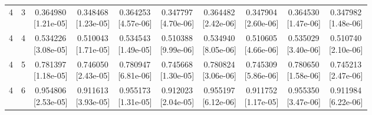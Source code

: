 \documentclass[12pt,letterpaper]{article}
\theoremstyle{plain}
\theoremstyle{definition}
\begin{document}
\begin{table}[p]
\begin{adjustbox}{max width=\linewidth}
\begin{tabular}{@{}rr*{8}{c}@{}}
4 & 3 & \shortstack{0.364980\\[-1pt]{\scriptsize[1.21e-05]}} & \shortstack{0.348468\\[-1pt]{\scriptsize[1.23e-05]}} & \shortstack{0.364253\\[-1pt]{\scriptsize[4.57e-06]}} & \shortstack{0.347797\\[-1pt]{\scriptsize[4.70e-06]}} & \shortstack{0.364482\\[-1pt]{\scriptsize[2.42e-06]}} & \shortstack{0.347904\\[-1pt]{\scriptsize[2.60e-06]}} & \shortstack{0.364530\\[-1pt]{\scriptsize[1.47e-06]}} & \shortstack{0.347982\\[-1pt]{\scriptsize[1.48e-06]}}\\
4 & 4 & \shortstack{0.534226\\[-1pt]{\scriptsize[3.08e-05]}} & \shortstack{0.510043\\[-1pt]{\scriptsize[1.71e-05]}} & \shortstack{0.534543\\[-1pt]{\scriptsize[1.49e-05]}} & \shortstack{0.510388\\[-1pt]{\scriptsize[9.99e-06]}} & \shortstack{0.534940\\[-1pt]{\scriptsize[8.05e-06]}} & \shortstack{0.510605\\[-1pt]{\scriptsize[4.66e-06]}} & \shortstack{0.535029\\[-1pt]{\scriptsize[3.40e-06]}} & \shortstack{0.510740\\[-1pt]{\scriptsize[2.10e-06]}}\\
4 & 5 & \shortstack{0.781397\\[-1pt]{\scriptsize[1.18e-05]}} & \shortstack{0.746050\\[-1pt]{\scriptsize[2.43e-05]}} & \shortstack{0.780947\\[-1pt]{\scriptsize[6.81e-06]}} & \shortstack{0.745668\\[-1pt]{\scriptsize[1.30e-05]}} & \shortstack{0.780824\\[-1pt]{\scriptsize[3.06e-06]}} & \shortstack{0.745309\\[-1pt]{\scriptsize[5.86e-06]}} & \shortstack{0.780650\\[-1pt]{\scriptsize[1.58e-06]}} & \shortstack{0.745213\\[-1pt]{\scriptsize[2.47e-06]}}\\
4 & 6 & \shortstack{0.954806\\[-1pt]{\scriptsize[2.53e-05]}} & \shortstack{0.911613\\[-1pt]{\scriptsize[3.93e-05]}} & \shortstack{0.955173\\[-1pt]{\scriptsize[1.31e-05]}} & \shortstack{0.912023\\[-1pt]{\scriptsize[2.04e-05]}} & \shortstack{0.955197\\[-1pt]{\scriptsize[6.12e-06]}} & \shortstack{0.911752\\[-1pt]{\scriptsize[1.17e-05]}} & \shortstack{0.955350\\[-1pt]{\scriptsize[3.47e-06]}} & \shortstack{0.911984\\[-1pt]{\scriptsize[6.22e-06]}}\\

\end{tabular}
\end{adjustbox}
\end{table}
\end{document}
